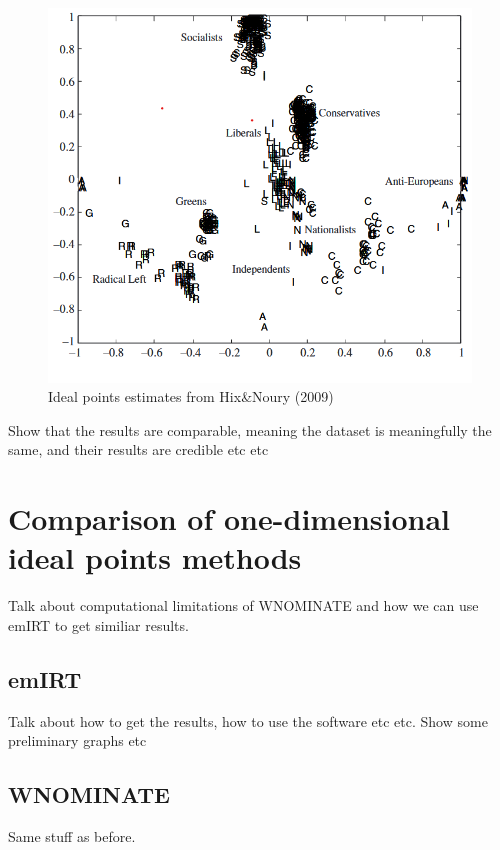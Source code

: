 \documentclass{report}
\begin{document}
        \begin{figure}[H]
        \centering
        \includegraphics[width=1\textwidth]{Graphs/Screenshot 2024-06-09 220607.png}
        \caption{Ideal points estimates from Hix&Noury (2009)}
        \label{fig:WNOMINATE HIX 6}
    \end{figure}

    Show that the results are comparable, meaning the dataset is meaningfully the same, and their results
    are credible etc etc


    \section{Comparison of one-dimensional ideal points methods}
    Talk about computational limitations of WNOMINATE and how we can use emIRT to get similiar results.

    \subsection{emIRT}
    Talk about how to get the results, how to use the software etc etc. Show some preliminary graphs etc

    \subsection{WNOMINATE}
    Same stuff as before.
\end{document}
